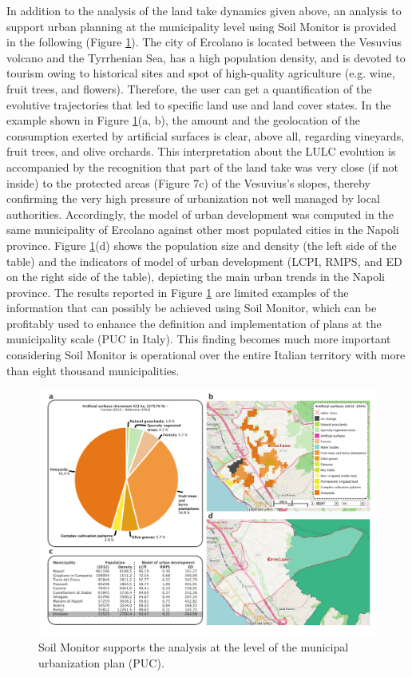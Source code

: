 \documentclass[APA,LATO1COL,doublespace]{WileyNJD-v2}
\begin{document}
In addition to the analysis of the land take dynamics given above, an analysis to support urban planning at the municipality level using Soil Monitor is provided in the following (Figure \ref{fig:caseCOM_Ercolano}).
The city of Ercolano is located between the Vesuvius volcano and the Tyrrhenian Sea, has a high population density, and is devoted to tourism owing to historical sites and spot of high-quality agriculture (e.g. wine, fruit trees, and flowers). 
Therefore, the user can get a quantification of the evolutive trajectories that led to specific land use and land cover states. 
In the example shown in Figure \ref{fig:caseCOM_Ercolano}(a, b), the amount and the geolocation of the consumption exerted by artificial surfaces is clear, above all, regarding vineyards, fruit trees, and olive orchards. 
This interpretation about the LULC evolution is accompanied by the recognition that part of the land take was very close (if not inside) to the protected areas (Figure 7c) of the Vesuvius's slopes, thereby confirming the very high pressure of urbanization not well managed by local authorities. 
Accordingly, the model of urban development was computed in the same municipality of Ercolano against other most populated cities in the Napoli province. 
Figure \ref{fig:caseCOM_Ercolano}(d) shows the population size and density (the left side of the table) and the indicators of model of urban development (LCPI, RMPS, and ED on the right side of the table), depicting the main urban trends in the Napoli province.
The results reported in Figure \ref{fig:caseCOM_Ercolano} are limited examples of the information that can possibly be achieved using Soil Monitor, which can be profitably used to enhance the definition and implementation of plans at the municipality scale (PUC in Italy).
This finding becomes much more important considering Soil Monitor is operational over the entire Italian territory with more than eight thousand municipalities.

\begin{figure}[t] %
    \centerline{\includegraphics[width=450pt]{daMileti/07_caso_comunale.pdf}}
    \caption{ Soil Monitor supports the analysis at the level of the municipal urbanization plan (PUC). }
    \label{fig:caseCOM_Ercolano}
\end{figure}
\end{document}
